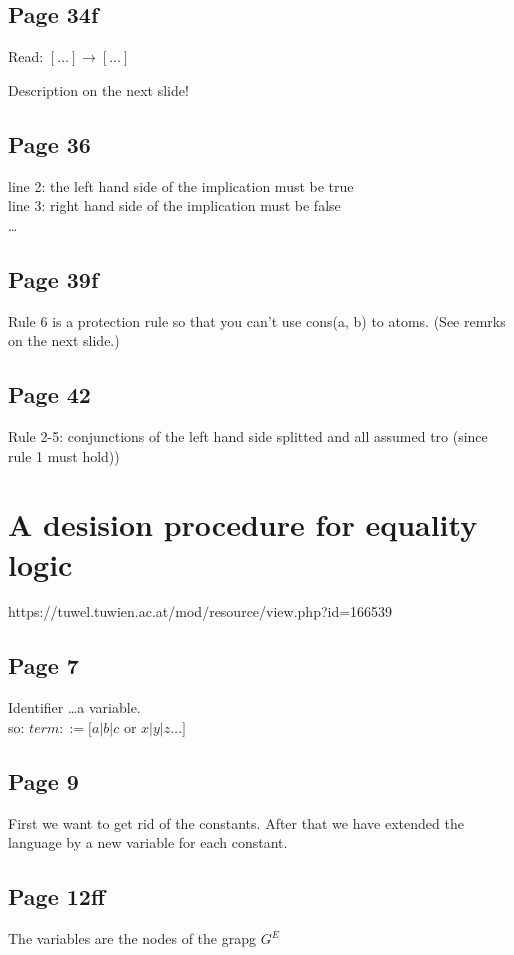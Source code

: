 \documentclass[a4paper]{article}
\begin{document}
\subsection{Page 34f}
Read: $[\ldots] \rightarrow [\ldots]$

Description on the next slide!

\subsection{Page 36}
line 2: the left hand side of the implication must be true\\
line 3: right hand side of the implication must be false\\
\ldots

\subsection{Page 39f}
Rule 6 is a protection rule so that you can't use cons(a, b) to atoms. (See
remrks on the next slide.)


\subsection{Page 42}

Rule 2-5: conjunctions of the left hand side splitted and all assumed tro
(since rule 1 must hold))



\section{A desision procedure for equality logic}
https://tuwel.tuwien.ac.at/mod/resource/view.php?id=166539

\subsection{Page 7}

Identifier \ldots a variable.\\
so: $term ::= [a|b|c$ or $x|y|z \ldots]$

\subsection{Page 9}
First we want to get rid of the constants. After that we have extended the
language by a new variable for each constant.

\subsection{Page 12ff}
The variables are the nodes of the grapg $G^E$
\end{document}
